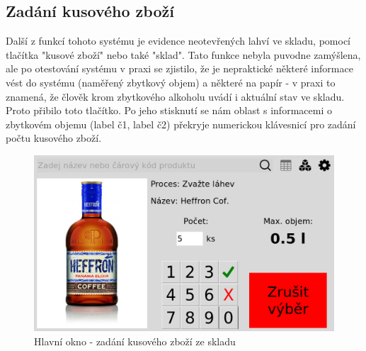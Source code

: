 \subsection{Zadání kusového zboží}
\label{sec: Zadání kusového zboží}
Další z funkcí tohoto systému je evidence neotevřených lahví ve skladu, pomocí tlačítka "kusové zboží" nebo také "sklad". Tato funkce nebyla puvodne zamýšlena, ale po otestování systému v praxi se zjistilo, že je nepraktické některé informace vést do systému (naměřený zbytkový objem) a některé na papír - v praxi to znamená, že člověk krom zbytkového alkoholu uvádí i aktuální stav ve skladu. Proto přibilo toto tlačítko. Po jeho stisknutí se nám oblast s informacemi o zbytkovém objemu (label č1, label č2) překryje numerickou klávesnicí pro zadání počtu kusového zboží. %

\begin{figure}[H]
    \begin{center}
        \includegraphics[scale=0.4]{obrazky/GUI Numericka klavesnice.png}
    \end{center}
    \caption{Hlavní okno - zadání kusového zboží ze skladu}
    \label{Hlavní okno - evidence kusového zboží ze skladu}
\end{figure}



